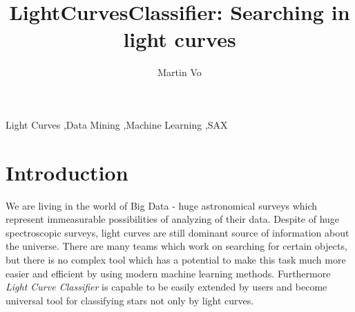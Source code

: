 \documentclass[final,5p,times,twocolumn,authoryear]{elsarticle}
\begin{document}
\begin{frontmatter}



\title{LightCurvesClassifier: Searching in light curves}


\author{ Martin Vo }

\address{ Czech Republic }

\begin{abstract}

\end{abstract}

\begin{keyword}
Light Curves \sep Data Mining \sep Machine Learning \sep SAX



\end{keyword}

\end{frontmatter}


\section{Introduction}
\label{}

We are living in the world of Big Data - huge astronomical surveys which represent immeasurable possibilities of analyzing of their data. Despite of huge spectroscopic surveys, light curves are still dominant source of information about the universe. There are many
teams which work on searching for certain objects, but there is no complex tool which has a potential to make this task much more easier and efficient by using modern machine learning methods. Furthermore  \textit{Light Curve Classifier} is capable to be easily extended by users and become universal tool for classifying stars not only by light curves.
\end{document}
